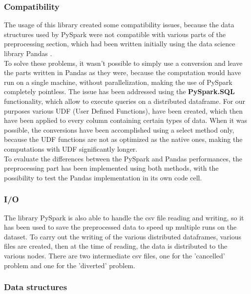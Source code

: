 \documentclass[
	letterpaper, %
	10pt, %
]{class}
\begin{document}
\subsubsection{Compatibility}

The usage of this library created some compatibility issues, because the data structures used by PySpark were not compatible with various parts of the preprocessing section, which had been written initially using the data science library Pandas \cite{pandas}.\\

To solve these problems, it wasn't possible to simply use a conversion and leave the parts written in Pandas as they were, because the computation would have run on a single machine, without parallelization, making the use of PySpark completely pointless.
The issue has been addressed using the \textbf{PySpark.SQL} functionality, which allow to execute queries on a distributed dataframe. For our purposes various UDF (User Defined Functions), have been created, which then have been applied to every column containing certain types of data.
When it was possible, the conversions have been accomplished using a select method only, because the UDF functions are not as optimized as the native ones, making the computations with UDF significantly longer.\\

To evaluate the differences between the PySpark and Pandas performances, the preprocessing part has been implemented using both methods, with the possibility to test the Pandas implementation in its own code cell.

\subsubsection{I/O}

The library PySpark is also able to handle the csv file reading and writing, so it has been used to save the preprocessed data to speed up multiple runs on the dataset. To carry out the writing of the various distributed dataframes, various files are created, then at the time of reading, the data is distributed to the various nodes. There are two intermediate csv files, one for the 'cancelled' problem and one for the 'diverted' problem.\\

\subsubsection{Data structures}
\end{document}

